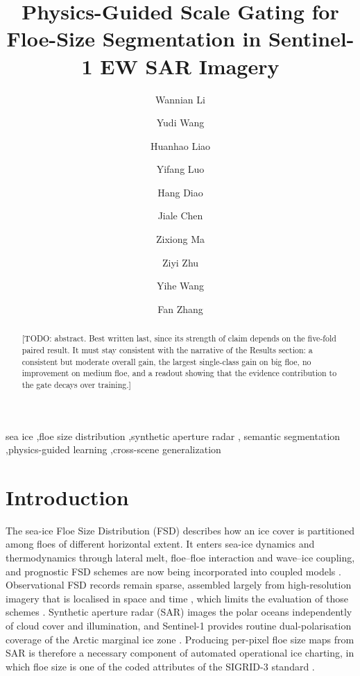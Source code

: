 \documentclass[preprint,12pt,authoryear]{elsarticle}
\begin{document}
\begin{frontmatter}

\title{Physics-Guided Scale Gating for Floe-Size Segmentation in
Sentinel-1 EW SAR Imagery}

\author[zju]{Wannian Li}
\author[zju]{Yudi Wang}
\author[zju]{Huanhao Liao}
\author[zju]{Yifang Luo}
\author[zju]{Hang Diao}
\author[zju]{Jiale Chen}
\author[zju]{Zixiong Ma}
\author[zju]{Ziyi Zhu}
\author[zju]{Yihe Wang}
\author[zju]{Fan Zhang}


\begin{abstract}
[TODO: abstract. Best written last, since its strength of claim depends on the
five-fold paired result. It must stay consistent with the narrative of the
Results section: a consistent but moderate overall gain, the largest
single-class gain on big floe, no improvement on medium floe, and a readout
showing that the evidence contribution to the gate decays over training.]
\end{abstract}

\begin{keyword}
sea ice \sep floe size distribution \sep synthetic aperture radar \sep
semantic segmentation \sep physics-guided learning \sep cross-scene generalization
\end{keyword}

\end{frontmatter}

\section{Introduction}
\label{sec:intro}

The sea-ice Floe Size Distribution (FSD) describes how an ice cover is partitioned among floes of different horizontal extent. It enters sea-ice dynamics and thermodynamics through lateral melt, floe--floe interaction and
wave--ice coupling, and prognostic FSD schemes are now being incorporated into coupled models \citep{rothrock1984measuring,horvat2015prognostic,bateson2022floe}.
Observational FSD records remain sparse, assembled largely from high-resolution imagery that is localised in space and time \citep{toyota2006characteristics,stern2018seasonal,stern2018reconciling}, which limits the evaluation of those schemes \citep{horvat2019estimating}. Synthetic aperture radar (SAR) images the polar oceans independently of cloud cover and
illumination, and Sentinel-1 provides routine dual-polarisation coverage of the Arctic marginal ice zone \citep{torres2012sentinel1}. Producing per-pixel floe size maps from SAR is therefore a necessary component of automated operational ice charting, in which floe size is one of the coded attributes of the SIGRID-3 standard \citep{jcomm2010sigrid3,stokholm2024autoice}.
\end{document}
